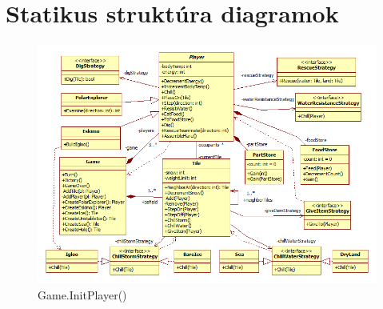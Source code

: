 \section{Statikus struktúra diagramok}


\begin{figure}[H]
	\begin{center}
		\includegraphics[angle=90, scale=0.76]{chapters/chapter03/ClassDiagramPart1.png}
		\caption{Game.InitPlayer()}
		\label{fig:GameInitPlayer}
	\end{center}
\end{figure}
